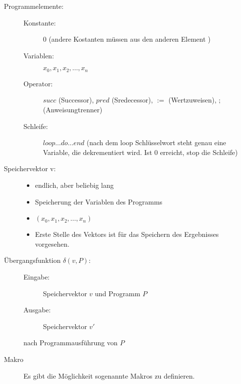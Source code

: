\documentclass{bschlangaul-theorie}
\begin{document}
\begin{description}
\item[Programmelemente:] \strut

\begin{description}
\item[Konstante:]
$0$ (andere Kostanten müssen aus den anderen Element )

\item[Variablen:]
$x_0, x_1, x_2, \dots, x_n$

\item[Operator:]

$succ$ (Successor), $pred$ (Sredecessor), $:=$ (Wertzuweisen), $;$ (Anweisungtrenner)

\item[Schleife:]

$loop \dots do \dots end$ (nach dem loop Schlüsselwort steht genau eine
Variable, die dekrementiert wird. Ist 0 erreicht, stop die Schleife)
\end{description}

\item[Speichervektor v:] \strut

\begin{itemize}
\item endlich, aber beliebig lang
\item Speicherung der Variablen des Programms
\item $(x_0, x_1, x_2, \dots, x_n)$
\item Erste Stelle des Vektors ist für das Speichern des Ergebnisses vorgesehen.
\end{itemize}

\item[Übergangsfunktion $\delta(v, P)$:] \strut

\begin{description}
\item[Eingabe:] Speichervektor $v$ und Programm $P$
\item[Ausgabe:] Speichervektor $v'$
\end{description}

nach Programmausführung von $P$

\item[Makro] \strut

Es gibt die Möglichkeit sogenannte Makros zu definieren.
\end{description}

%

\end{document}
